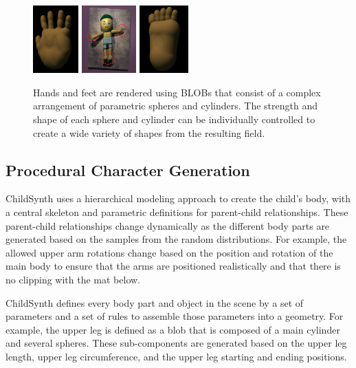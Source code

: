 \documentclass{article}
\begin{document}
\begin{figure}[htbp]
    \centering
    \includegraphics[height=2.6cm]{plots/hand.png}
    \includegraphics[height=2.6cm]{plots/back.png}
    \includegraphics[height=2.6cm]{plots/foot.png}
    \caption{Hands and feet are rendered using BLOBs that consist of a complex arrangement of parametric spheres and cylinders. The strength and shape of each sphere and cylinder can be individually controlled to create a wide variety of shapes from the resulting field.}
    \label{fig:hand_foot}
\end{figure}

\subsection{Procedural Character Generation}
ChildSynth uses a hierarchical modeling approach to create the child's body, with a central skeleton and parametric definitions for parent-child relationships. These parent-child relationships change dynamically as the different body parts are generated based on the samples from the random distributions. For example, the allowed upper arm rotations change based on the position and rotation of the main body to ensure that the arms are positioned realistically and that there is no clipping with the mat below.

ChildSynth defines every body part and object in the scene by a set of parameters and a set of rules to assemble those parameters into a geometry. For example, the upper leg is defined as a blob that is composed of a main cylinder and several spheres. These sub-components are generated based on the upper leg length, upper leg circumference, and the upper leg starting and ending positions. 
\end{document}
